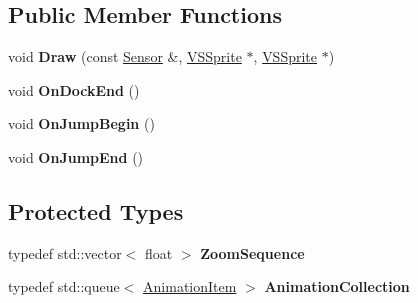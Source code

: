 \subsection*{Public Member Functions}
\begin{DoxyCompactItemize}
\item 
void {\bfseries Draw} (const \hyperlink{classRadar_1_1Sensor}{Sensor} \&, \hyperlink{classVSSprite}{V\+S\+Sprite} $\ast$, \hyperlink{classVSSprite}{V\+S\+Sprite} $\ast$)\hypertarget{classRadar_1_1BubbleDisplay_a3e75b0e4ef86d5f99eebacb2ea665ba1}{}\label{classRadar_1_1BubbleDisplay_a3e75b0e4ef86d5f99eebacb2ea665ba1}

\item 
void {\bfseries On\+Dock\+End} ()\hypertarget{classRadar_1_1BubbleDisplay_aed12f133906170519f51081cd6646f54}{}\label{classRadar_1_1BubbleDisplay_aed12f133906170519f51081cd6646f54}

\item 
void {\bfseries On\+Jump\+Begin} ()\hypertarget{classRadar_1_1BubbleDisplay_a8e457e9f4a36fe59d9c9a23755e65ea1}{}\label{classRadar_1_1BubbleDisplay_a8e457e9f4a36fe59d9c9a23755e65ea1}

\item 
void {\bfseries On\+Jump\+End} ()\hypertarget{classRadar_1_1BubbleDisplay_aec569d96355a749f7d7febe70c4b1f9b}{}\label{classRadar_1_1BubbleDisplay_aec569d96355a749f7d7febe70c4b1f9b}

\end{DoxyCompactItemize}
\subsection*{Protected Types}
\begin{DoxyCompactItemize}
\item 
typedef std\+::vector$<$ float $>$ {\bfseries Zoom\+Sequence}\hypertarget{classRadar_1_1BubbleDisplay_ab0f4ab60a8af1873fd8a169e22045a3e}{}\label{classRadar_1_1BubbleDisplay_ab0f4ab60a8af1873fd8a169e22045a3e}

\item 
typedef std\+::queue$<$ \hyperlink{structRadar_1_1BubbleDisplay_1_1AnimationItem}{Animation\+Item} $>$ {\bfseries Animation\+Collection}\hypertarget{classRadar_1_1BubbleDisplay_a5e5d9ed35d57d472bec66b1aa3017e80}{}\label{classRadar_1_1BubbleDisplay_a5e5d9ed35d57d472bec66b1aa3017e80}

\end{DoxyCompactItemize}
